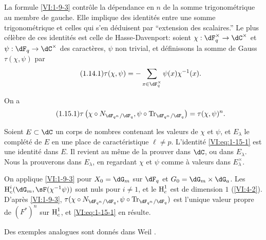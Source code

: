 \subsection{}\label{VI:1-14}

La formule \ref{VI:1-9-3} contrôle la dépendance en $n$ de la somme 
trigonométrique au membre de gauche. Elle implique des identités entre une 
somme trigonométrique et celles qui s'en déduisent par ``extension des 
scalaires.'' Le plus célèbre de ces identités est celle de 
Hasse-Davenport: soient $\chi:\dF_q^\times \to \dC^\times$ et 
$\psi:\dF_q\to \dC^\times$ des caractères, $\psi$ non trivial, et 
définissons la somme de Gauss $\tau(\chi,\psi)$ par 
\begin{equation*}\tag{1.14.1}\label{VI:eq:1-14-1}
  \tau(\chi,\psi) = - \sum_{x\in \dF_q^\times} \psi(x) \chi^{-1}(x) \text{.}
\end{equation*}





\begin{theorem_}\label{VI:1-15}
On a 
\begin{equation*}\tag{1.15.1}\label{VI:eq:1-15-1}
  \tau\left(\chi\circ N_{\dF_{q^n}/\dF_q},\psi\circ \tr_{\dF_{q^n}/\dF_q}\right) = \tau(\chi,\psi)^n \text{.}
\end{equation*}
\end{theorem_}

Soient $E\subset \dC$ un corps de nombres contenant les valeurs de $\chi$ et 
$\psi$, et $E_\lambda$ le complété de $E$ en une place de caractéristique 
$\ell\ne p$. L'identité \eqref{VI:eq:1-15-1} est une identité dans $E$. Il 
revient au même de la prouver dans $\dC$, ou dans $E_\lambda$. Nous la 
prouverons dans $E_\lambda$, en regardant $\chi$ et $\psi$ comme à valeurs 
dans $E_\lambda^\times$. 

On applique \ref{VI:1-9-3} pour $X_0=\dG_m$ sur $\dF_q$ et 
$G_0=\dG_m\times \dG_a$. Les $\h_c^i(\dG_m,\sF(\chi^{-1}\psi))$ sont nuls pour 
$i\ne 1$, et le $\operatorname{H}_c^1$ est de dimension $1$ (\ref{VI:4-2}). D'après 
\ref{VI:1-9-3}, 
$\tau(\chi\circ N_{\dF_{q^n}/\dF_q},\psi\circ \tr_{\dF_{q^n}/\dF_q})$ est 
l'unique valeur propre de $(F^\ast)^n$ sur $\operatorname{H}_c^1$, et \eqref{VI:eq:1-15-1} en 
résulte. 

Des exemples analogues sont donnés dans Weil \cite[App V]{we74}. 





\subsection{}\label{VI:1-16}

